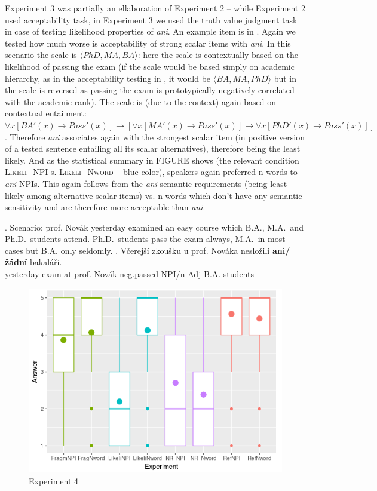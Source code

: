 \documentclass[12pt]{scrartcl}
\begin{document}
Experiment 3 was partially an ellaboration of Experiment 2 -- while Experiment 2 used acceptability task, in Experiment 3 we used the truth value judgment task in case of testing likelihood properties of \textit{ani}. An example item is in \Next. Again we tested how much worse is acceptability of strong scalar items with \textit{ani}. In this scenario the scale is $\langle PhD,MA,BA\rangle$: here the scale is contextually based on the likelihood of passing the exam (if the scale would be based simply on academic hierarchy, as in the acceptability testing in \Last, it would be $\langle BA,MA,PhD\rangle$ but in \Next the scale is reversed as passing the exam is prototypically negatively correlated with the academic rank). The scale is (due to the context) again based on contextual entailment: $\forall x[BA'(x) \rightarrow  Pass'(x)] \rightarrow [\forall x[MA'(x) \rightarrow Pass'(x)] \rightarrow \forall x[PhD'(x) \rightarrow Pass'(x)]]$. Therefore \textit{ani} associates again with the strongest scalar item (in positive version of a tested sentence entailing all its scalar alternatives), therefore being the least likely. And as the statistical summary in FIGURE shows (the relevant condition \textsc{Likeli\_NPI} s. \textsc{Likeli\_Nword} -- blue color), speakers again preferred n-words to \textit{ani} NPIs.  This again follows from the \textit{ani} semantic requirements (being least likely among alternative scalar items)  vs. n-words which don't have any semantic sensitivity and are therefore more acceptable than \textit{ani}. 

\ex. Scenario: prof. Novák yesterday examined an easy course which B.A.,
M.A.~and Ph.D.~students attend. Ph.D.~students pass the exam always,
M.A.~in most cases but B.A. only seldomly. \a. Včerejší zkoušku u prof.
Nováka nesložili \textbf{ani/žádní} bakaláři.\\
yesterday exam at prof. Novák neg.passed NPI/n-Adj B.A.-students

\begin{figure}
\centering
\includegraphics{include/Rplot04.png}
\caption{Experiment 4}
\end{figure}
\end{document}
